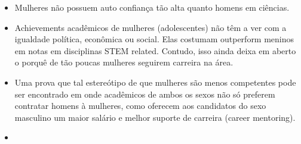 \begin{itemize}
	\item Mulheres não possuem auto confiança tão alta quanto homens em ciências. \cite{fox1992confidence}
	\item Achievements acadêmicos de mulheres (adolescentes) não têm a ver com a igualdade política, econômica ou social. Elas costumam outperform meninos em notas em disciplinas STEM related. Contudo, isso ainda deixa em aberto o porquê de tão poucas mulheres seguirem carreira na área. \cite{stoet2015sex}
	\item Uma prova que tal estereótipo de que mulheres são menos competentes pode ser encontrado em \cite{moss2012science} onde acadêmicos de ambos os sexos não só preferem contratar homens à mulheres, como oferecem aos candidatos do sexo masculino um maior salário e melhor suporte de carreira (career mentoring).
	\item 
\end{itemize}



